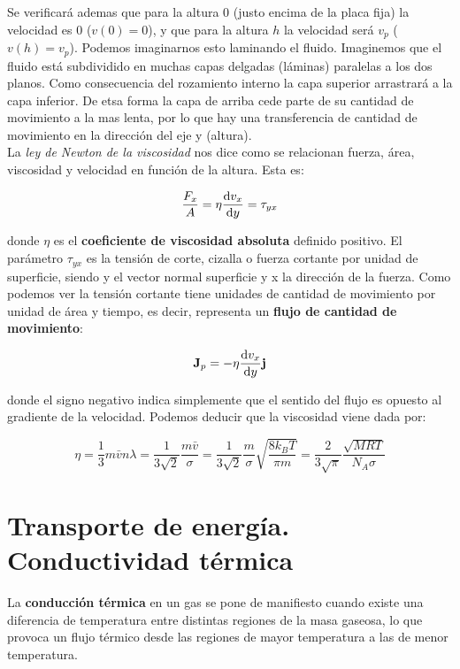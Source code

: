 \documentclass[12pt]{book}
\begin{document}
Se verificará ademas que para la altura 0 (justo encima de la placa fija) la velocidad es 0 ($v(0)=0$), y que para la altura $h$ la velocidad será $v_p$ ($v(h)=v_p$). Podemos imaginarnos esto laminando el fluido. Imaginemos que el fluido está subdividido en muchas capas delgadas (láminas) paralelas a los dos planos. Como consecuencia del rozamiento interno la capa superior arrastrará a la capa inferior. De etsa forma la capa de arriba cede parte de su cantidad de movimiento a la mas lenta, por lo que hay una transferencia de cantidad de movimiento en la dirección del eje y (altura). \\

La \textit{ley de Newton de la viscosidad} nos dice como se relacionan fuerza, área, viscosidad y velocidad en función de la altura. Esta es:

\begin{equation}
\dfrac{F_x}{A} = \eta \dfrac{\mathrm{d} v_x}{\mathrm{d} y} = \tau_{yx}
\end{equation}

donde $\eta$ es el \textbf{coeficiente de viscosidad absoluta} definido positivo. El parámetro $\tau_{yx}$ es la tensión de corte, cizalla o fuerza cortante por unidad de superficie, siendo y el vector normal superficie y x la dirección de la fuerza. Como podemos ver la tensión cortante tiene unidades de cantidad de movimiento por unidad de área y tiempo, es decir, representa un  \textbf{flujo de cantidad de movimiento}:

\begin{equation}
\textbf{J}_p = - \eta \dfrac{\mathrm{d} v_x}{\mathrm{d} y} \mathbf{j}
\end{equation}

donde el signo negativo indica simplemente que el sentido del flujo es opuesto al gradiente de la velocidad. Podemos deducir que la viscosidad viene dada por:

\begin{equation}
\eta = \dfrac{1}{3} m \bar{v} n \lambda = \dfrac{1}{3 \sqrt{2}} \dfrac{m \bar{v}}{\sigma} = \dfrac{1}{3 \sqrt{2}} \dfrac{m}{\sigma} \sqrt{\dfrac{8 k_B T}{\pi m}} = \dfrac{2}{3 \sqrt{\pi}} \dfrac{\sqrt{MRT}}{N_A \sigma}
\end{equation}

\section{Transporte de energía. Conductividad térmica}

La \textbf{conducción térmica} en un gas se pone de manifiesto cuando existe una diferencia de temperatura entre distintas regiones de la masa gaseosa, lo que provoca un flujo térmico desde las regiones de mayor temperatura a las de menor temperatura. \\
\end{document}
